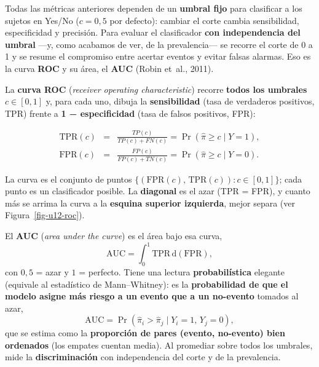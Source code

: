 \documentclass[
  letterpaper,
  DIV=11,
  numbers=noendperiod]{scrartcl}
\newenvironment{Shaded}{\begin{snugshade}}{\end{snugshade}}
\newcommand{\AttributeTok}[1]{\textcolor[rgb]{0.40,0.45,0.13}{#1}}
\newcommand{\ConstantTok}[1]{\textcolor[rgb]{0.56,0.35,0.01}{#1}}
\newcommand{\FunctionTok}[1]{\textcolor[rgb]{0.28,0.35,0.67}{#1}}
\newcommand{\NormalTok}[1]{\textcolor[rgb]{0.00,0.23,0.31}{#1}}
\newcommand{\OtherTok}[1]{\textcolor[rgb]{0.00,0.23,0.31}{#1}}
\newcommand{\SpecialCharTok}[1]{\textcolor[rgb]{0.37,0.37,0.37}{#1}}
\begin{document}
Todas las métricas anteriores dependen de un \textbf{umbral fijo} para
clasificar a los sujetos en Yes/No (\(c=0{,}5\) por defecto): cambiar el
corte cambia sensibilidad, especificidad y precisión. Para evaluar el
clasificador \textbf{con independencia del umbral} ---y, como acabamos
de ver, de la prevalencia--- se recorre el corte de 0 a 1 y se resume el
compromiso entre acertar eventos y evitar falsas alarmas. Eso es la
curva \textbf{ROC} y su área, el \textbf{AUC} (Robin et~al., 2011).

La \textbf{curva ROC} (\emph{receiver operating characteristic}) recorre
\textbf{todos los umbrales} \(c\in[0,1]\) y, para cada uno, dibuja la
\textbf{sensibilidad} (tasa de verdaderos positivos, TPR) frente a
\textbf{1 − especificidad} (tasa de falsos positivos, FPR):

\begin{eqnarray}
\text{TPR}(c)&=&\frac{TP(c)}{TP(c)+FN(c)}=\Pr(\hat\pi\ge c\mid Y=1),\\
\text{FPR}(c)&=&\frac{FP(c)}{FP(c)+TN(c)}=\Pr(\hat\pi\ge c\mid Y=0).
\end{eqnarray}

La curva es el conjunto de puntos
\(\{(\text{FPR}(c),\,\text{TPR}(c)):c\in[0,1]\}\); cada punto es un
clasificador posible. La \textbf{diagonal} es el azar (TPR = FPR), y
cuanto más se arrima la curva a la \textbf{esquina superior izquierda},
mejor separa (ver Figura~\ref{fig-u12-roc}).

El \textbf{AUC} (\emph{area under the curve}) es el área bajo esa curva,
\[
\text{AUC}=\int_0^1 \text{TPR}\,\mathrm{d}(\text{FPR}),
\] con \(0{,}5\) = azar y \(1\) = perfecto. Tiene una lectura
\textbf{probabilística} elegante (equivale al estadístico de
Mann--Whitney): es la \textbf{probabilidad de que el modelo asigne más
riesgo a un evento que a un no-evento} tomados al azar, \[
\text{AUC}=\Pr(\hat\pi_i>\hat\pi_j\mid Y_i=1,\,Y_j=0),
\] que se estima como la \textbf{proporción de pares (evento, no-evento)
bien ordenados} (los empates cuentan media). Al promediar sobre todos
los umbrales, mide la \textbf{discriminación} con independencia del
corte y de la prevalencia.

\begin{Shaded}
\end{Shaded}
\end{document}
